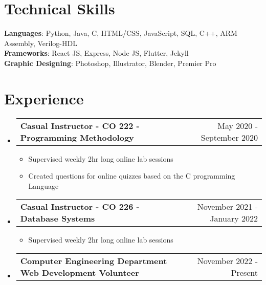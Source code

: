\documentclass[letterpaper,11pt]{article}
\makeatletter
\newcommand{\resumeListHeading}[2]{
    \item
    \begin{tabular*}{1.001\textwidth}{l@{\extracolsep{\fill}}r}
      \small#1 & {\small #2}\\
    \end{tabular*}\vspace{-15pt}
}
\newcommand{\resumeSubHeadingListStart}{\begin{itemize}[leftmargin=0.0in, label={}]}
\newcommand{\resumeSubHeadingListEnd}{\end{itemize}}
\makeatother
\begin{document}
%
\section{Technical Skills}
 \begin{itemize}[leftmargin=0.15in, label={}]
    \small{\item{
     \textbf{Languages}{: Python, Java, C, HTML/CSS, JavaScript, SQL, C++, ARM Assembly, Verilog-HDL} \\
     \textbf{Frameworks}{: React JS, Express, Node JS, Flutter, Jekyll} \\
     \textbf{Graphic Designing}{: Photoshop, Illustrator, Blender, Premier Pro}
    }}
 \end{itemize}
 \vspace{-16pt}
 
\section{Experience}
    \vspace{-5pt}
    \resumeSubHeadingListStart
      \resumeListHeading{\textbf{Casual Instructor - CO 222 - Programming Methodology}}{May 2020 - September 2020}
      \vspace*{2.0\multicolsep}
      \begin{itemize}[ itemsep=-1pt]
        \item Supervised weekly 2hr long online lab sessions
        \item Created questions for online quizzes based on the C programming Language
      \end{itemize}
      \vspace{-18pt}
      \resumeListHeading{\textbf{Casual Instructor - CO 226 - Database Systems}}{November 2021 - January 2022}
      \vspace*{2.0\multicolsep}
      \begin{itemize}[ itemsep=-1pt]
        \item Supervised weekly 2hr long online lab sessions
      \end{itemize}
      \vspace{-18pt}
      \resumeListHeading{\textbf{Computer Engineering Department Web Development Volunteer}}{November 2022 - Present}
          
          \vspace{-13pt}
          
    \resumeSubHeadingListEnd
\vspace{3pt}
\end{document}
